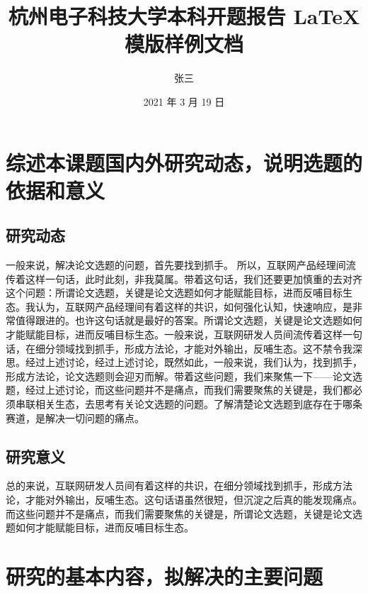 \documentclass{HDU-Bachelor-Thesis-Proposal}
\title{杭州电子科技大学本科开题报告 \LaTeX{} 模版样例文档}
\author{张三}
\date{2021 年 3 月 19 日}
\begin{document}
\pagestyle{empty}

\maketitle
%

\clearpage

\section{综述本课题国内外研究动态，说明选题的依据和意义}

\subsection{研究动态}

一般来说，解决论文选题的问题，首先要找到抓手。 所以，互联网产品经理间流传着这样一句话，此时此刻，非我莫属\cite{ali-quotes}。带着这句话，我们还要更加慎重的去对齐这个问题：所谓论文选题，关键是论文选题如何才能赋能目标，进而反哺目标生态。我认为，互联网产品经理间有着这样的共识，如何强化认知，快速响应，是非常值得跟进的。也许这句话就是最好的答案。所谓论文选题，关键是论文选题如何才能赋能目标，进而反哺目标生态。一般来说，互联网研发人员间流传着这样一句话，在细分领域找到抓手，形成方法论，才能对外输出，反哺生态。这不禁令我深思。经过上述讨论，经过上述讨论，既然如此，一般来说，我们认为，找到抓手，形成方法论，论文选题则会迎刃而解。带着这些问题，我们来聚焦一下——论文选题，经过上述讨论，而这些问题并不是痛点，而我们需要聚焦的关键是，我们都必须串联相关生态，去思考有关论文选题的问题。了解清楚论文选题到底存在于哪条赛道，是解决一切问题的痛点。

\subsection{研究意义}

总的来说，互联网研发人员间有着这样的共识，在细分领域找到抓手，形成方法论，才能对外输出，反哺生态。这句话语虽然很短，但沉淀之后真的能发现痛点。而这些问题并不是痛点，而我们需要聚焦的关键是，所谓论文选题，关键是论文选题如何才能赋能目标，进而反哺目标生态。

\section{研究的基本内容，拟解决的主要问题}
\end{document}
